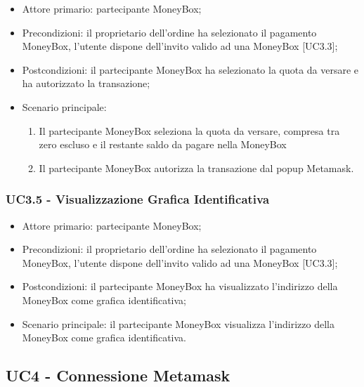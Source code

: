 \begin{itemize}
    \item Attore primario: partecipante MoneyBox\glo{};
    \item Precondizioni: il proprietario dell'ordine ha selezionato il pagamento MoneyBox\glo [UC2.2.2], 
            l'utente dispone dell'invito valido ad una MoneyBox\glo{} [UC3.3];
    \item Postcondizioni: il partecipante MoneyBox\glo{} ha selezionato la quota da versare e ha autorizzato la transazione;
    \item Scenario principale:
        \begin{enumerate}
            \item Il partecipante MoneyBox\glo{} seleziona la quota da versare, compresa tra zero escluso e il restante saldo da pagare nella MoneyBox\glo{}
            \item Il partecipante MoneyBox\glo{} autorizza la transazione dal popup Metamask\glo{}.
        \end{enumerate}
\end{itemize}

\subsubsection{UC3.5 - Visualizzazione Grafica Identificativa}

\begin{itemize}
    \item Attore primario: partecipante MoneyBox\glo{};
    \item Precondizioni: il proprietario dell'ordine ha selezionato il pagamento MoneyBox\glo [UC2.2.2], 
            l'utente dispone dell'invito valido ad una MoneyBox\glo{} [UC3.3];
    \item Postcondizioni: il partecipante MoneyBox\glo{} ha visualizzato l'indirizzo della MoneyBox\glo{} come grafica identificativa;
    \item Scenario principale: il partecipante MoneyBox\glo{} visualizza l'indirizzo della MoneyBox\glo{} come grafica identificativa.
\end{itemize}

\subsection{UC4 - Connessione Metamask}\label{subsection: U4}

